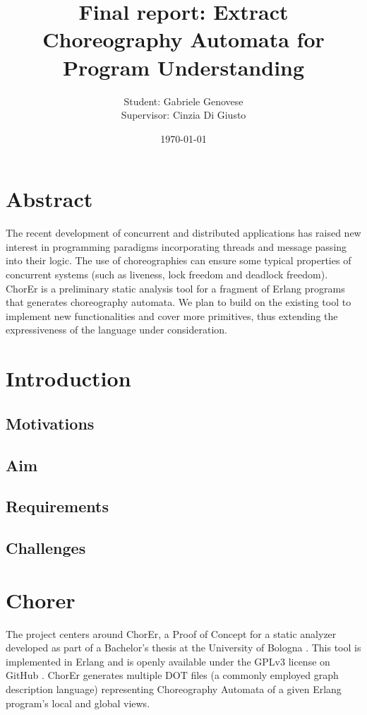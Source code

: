 \documentclass{article}
\title{Final report: Extract Choreography Automata for Program Understanding}
\author{Student: Gabriele Genovese\\Supervisor: Cinzia Di Giusto}
\date{\today}
\theoremstyle{definition}
\theoremstyle{definition}
\begin{document}
\maketitle


\section*{Abstract}
The recent development of concurrent and distributed applications has raised new
interest in programming paradigms incorporating threads and message passing into
their logic. The use of choreographies
can ensure some typical properties of concurrent systems (such as liveness, lock
freedom and deadlock freedom). ChorEr is a preliminary static analysis tool for
a fragment of Erlang programs that generates choreography automata. We plan to
build on the existing tool to implement new functionalities and cover more
primitives, thus extending the expressiveness of the language under consideration.

\newpage

\tableofcontents

\newpage

\section{Introduction}


\subsection{Motivations}


\subsection{Aim}


\subsection{Requirements}


\subsection{Challenges}


\section{Chorer}
The project centers around ChorEr, a Proof of Concept for a static analyzer 
developed as part of a Bachelor's thesis at the University of Bologna 
\cite{genovese2023chorer}. This tool is implemented in Erlang and is openly 
available under the GPLv3 license on GitHub \cite{website:chorer}. ChorEr 
generates multiple DOT files (a commonly employed graph description language) 
representing Choreography Automata of a given Erlang program's local and 
global views.
\end{document}
